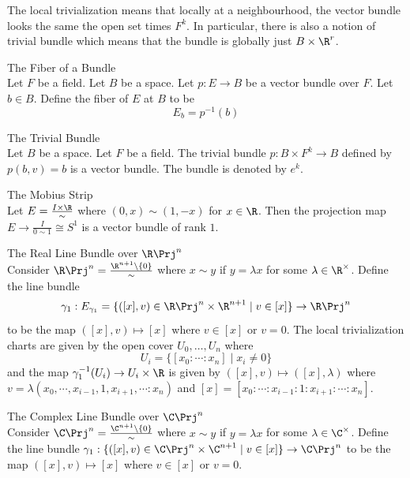 \documentclass[a4paper]{article}
\begin{document}
The local trivialization means that locally at a neighbourhood, the vector bundle looks the same the open set times $F^k$. In particular, there is also a notion of trivial bundle which means that the bundle is globally just $B\times\R^r$. 

\begin{defn}{The Fiber of a Bundle}{}\\
Let $F$ be a field. Let $B$ be a space. Let $p:E\to B$ be a vector bundle over $F$. Let $b\in B$. Define the fiber of $E$ at $B$ to be $$E_b=p^{-1}(b)$$
\end{defn}

\begin{eg}{The Trivial Bundle}{}\\
Let $B$ be a space. Let $F$ be a field. The trivial bundle $p:B\times F^k\to B$ defined by $p(b,v)=b$ is a vector bundle. The bundle is denoted by $e^k$. 
\end{eg}

\begin{eg}{The Mobius Strip}{}\\
Let $E=\frac{I\times\R}{\sim}$ where $(0,x)\sim(1,-x)$ for $x\in\R$. Then the projection map $E\to\frac{I}{0\sim 1}\cong S^1$ is a vector bundle of rank $1$. 
\end{eg}

\begin{eg}{The Real Line Bundle over $\R\Prj^n$}{}\\
Consider $\R\Prj^n=\frac{\R^{n+1}\setminus\{0\}}{\sim}$ where $x\sim y$ if $y=\lambda x$ for some $\lambda\in\R^\times$. Define the line bundle $$\gamma_1:E_{\gamma_1}=\{([x],v)\in\R\Prj^n\times\R^{n+1}\;|\;v\in[x]\}\to\R\Prj^n$$ to be the map $([x],v)\mapsto[x]$ where $v\in[x]$ or $v=0$. The local trivialization charts are given by the open cover $U_0,\dots,U_n$ where $$U_i=\{[x_0:\cdots:x_n]\;|\;x_i\neq 0\}$$ and the map $\gamma_1^{-1}(U_i)\to U_i\times\R$ is given by $([x],v)\mapsto([x],\lambda)$ where $v=\lambda(x_0,\cdots,x_{i-1},1,x_{i+1},\cdots:x_n)$ and $[x]=[x_0:\cdots:x_{i-1}:1:x_{i+1}:\cdots:x_n]$. 
\end{eg}

\begin{eg}{The Complex Line Bundle over $\C\Prj^n$}{}\\
Consider $\C\Prj^n=\frac{\C^{n+1}\setminus\{0\}}{\sim}$ where $x\sim y$ if $y=\lambda x$ for some $\lambda\in\C^\times$. Define the line bundle $\gamma_1:\{([x],v)\in\C\Prj^n\times\C^{n+1}\;|\;v\in[x]\}\to\C\Prj^n$ to be the map $([x],v)\mapsto[x]$ where $v\in[x]$ or $v=0$. 
\end{eg}
\end{document}
